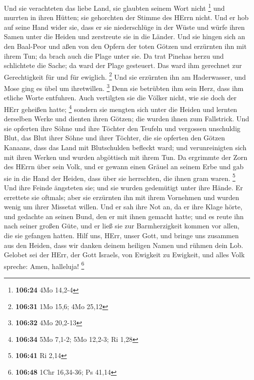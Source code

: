 Und sie verachteten das liebe Land, sie glaubten seinem Wort nicht
\footnote{\textbf{106:24} 4Mo 14,2-4}  und murrten in
ihren Hütten; sie gehorchten der Stimme des HErrn nicht. 
Und er hob auf seine Hand wider sie, dass er sie niederschlüge in der
Wüste  und würfe ihren Samen unter die Heiden und
zerstreute sie in die Länder.  Und sie hingen sich an den
Baal-Peor und aßen von den Opfern der toten Götzen  und
erzürnten ihn mit ihrem Tun; da brach auch die Plage unter sie.
 Da trat Pinehas herzu und schlichtete die Sache; da ward
der Plage gesteuert.  Das ward ihm gerechnet zur
Gerechtigkeit für und für ewiglich. \footnote{\textbf{106:31} 1Mo 15,6;
  4Mo 25,12}  Und sie erzürnten ihn am Haderwasser, und
Mose ging es übel um ihretwillen. \footnote{\textbf{106:32} 4Mo 20,2-13}
 Denn sie betrübten ihm sein Herz, dass ihm etliche Worte
entfuhren.  Auch vertilgten sie die Völker nicht, wie sie
doch der HErr geheißen hatte; \footnote{\textbf{106:34} 5Mo 7,1-2; 5Mo
  12,2-3; Ri 1,28}  sondern sie mengten sich unter die
Heiden und lernten derselben Werke  und dienten ihren
Götzen; die wurden ihnen zum Fallstrick.  Und sie
opferten ihre Söhne und ihre Töchter den Teufeln  und
vergossen unschuldig Blut, das Blut ihrer Söhne und ihrer Töchter, die
sie opferten den Götzen Kanaans, dass das Land mit Blutschulden befleckt
ward;  und verunreinigten sich mit ihren Werken und
wurden abgöttisch mit ihrem Tun.  Da ergrimmte der Zorn
des HErrn über sein Volk, und er gewann einen Gräuel an seinem Erbe
 und gab sie in die Hand der Heiden, dass über sie
herrschten, die ihnen gram waren. \footnote{\textbf{106:41} Ri 2,14}
 Und ihre Feinde ängsteten sie; und sie wurden gedemütigt
unter ihre Hände.  Er errettete sie oftmals; aber sie
erzürnten ihn mit ihrem Vornehmen und wurden wenig um ihrer Missetat
willen.  Und er sah ihre Not an, da er ihre Klage hörte,
 und gedachte an seinen Bund, den er mit ihnen gemacht
hatte; und es reute ihn nach seiner großen Güte,  und er
ließ sie zur Barmherzigkeit kommen vor allen, die sie gefangen hatten.
 Hilf uns, HErr, unser Gott, und bringe uns zusammen aus
den Heiden, dass wir danken deinem heiligen Namen und rühmen dein Lob.
 Gelobet sei der HErr, der Gott Israels, von Ewigkeit zu
Ewigkeit, und alles Volk spreche: Amen, halleluja! \footnote{\textbf{106:48}
  1Chr 16,34-36; Ps 41,14}

